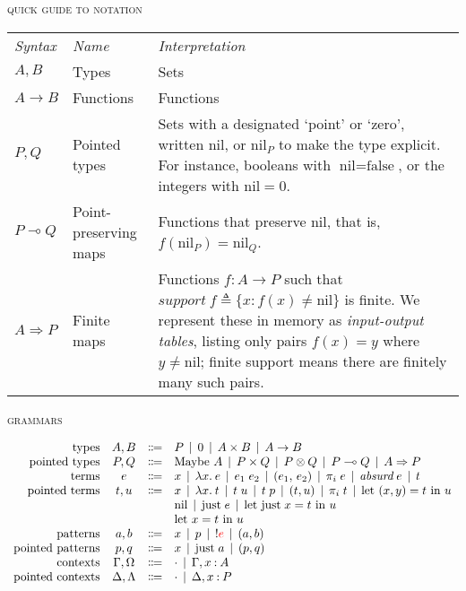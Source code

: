 \documentclass{article}
\newcommand\G\Gamma
\newcommand\D\Delta
\renewcommand\O\Omega
\renewcommand\L\Lambda
\newcommand\lto\multimap        %
\newcommand\fto{\Rightarrow}
\newcommand\tmaybe[1]{\ensuremath{{#1}_{*}}}
\renewcommand\tmaybe[1]{\ensuremath{\text{Maybe}~{#1}}}
\newcommand\bnfeq{\Coloneqq}
\newcommand\bnfor{\mathrel{\,|\,}}
\newcommand\emptycx{{\cdot}}
\newcommand\hyp[2]{{#1} \of {#2}}
\newcommand\of{\mathbin{:}}
\newcommand\fname\textit        %
\newcommand\cname\text          %
\newcommand\fnspace\:           %
\newcommand\fn[1]{\lambda{#1}.\fnspace}
\newcommand\<\;                 %
\newcommand\cnil{\cname{nil}}
\newcommand\cjust{\cname{just}}
\newcommand\tnil{\cnil}
\newcommand\tjust[1]{\cjust\<{#1}}
\newcommand\letin[2]{\text{let}~{#1}~\text{in}~{#2}}
\newcommand\leteq[3]{\letin{{#1} = {#2}}{#3}}
\newcommand\letjust[3]{\leteq{\tjust {#1}}{#2}{#3}}
\newcommand\letpair[4]{\leteq{({#1}, {#2})}{#3}{#4}}
\newcommand\tabsurd{\fname{absurd}\<}
\newcommand\peq{{!}}
\newcommand\todocolor{\color{red}}
\begin{document}

\noindent\textsc{quick guide to notation}

\newcommand\support{\ensuremath{\fname{support}}}
\newcommand\supportof[1]{\ensuremath{\support~{#1}}}
\newcommand\defeq{\triangleq}

\begin{tabular}{llp{10cm}}%
  \it Syntax & \it Name & \it Interpretation\\
  $A,B$ & Types & Sets\\
  $A \to B$ & Functions & Functions\\
  $P,Q$ & Pointed types & Sets with a designated `point' or `zero', written $\tnil$, or $\tnil_P$ to make the type explicit.
  For instance, booleans with $\tnil = \text{false}$, or the integers with $\tnil = 0$.
  \\
  $P \lto Q$ & Point-preserving maps & Functions that preserve $\tnil$, that is, $f(\tnil_P) = \tnil_Q$.
  \\
  $A \fto P$ & Finite maps &
  Functions $f : A \to P$ such that $\supportof{f} \defeq \{ x : f(x) \ne \tnil \}$ is finite.
  We represent these in memory as \emph{input-output tables}, listing only pairs $f(x) = y$ where $y \ne \tnil$; finite support means there are finitely many such pairs.
\end{tabular}


\noindent
\textsc{grammars}

\[
\begin{array}{rccl}
  \text{types} & A,B &\bnfeq&
  P \bnfor 0 \bnfor A \times B \bnfor A \to B
  \\
  \text{pointed types} & P,Q &\bnfeq&
  \tmaybe A \bnfor P \times Q \bnfor P \otimes Q
  \bnfor P \lto Q
  \bnfor A \fto P
  \\
  \text{terms} & e &\bnfeq& x \bnfor \fn{x} e \bnfor e_1\<e_2
  \bnfor (e_1,\, e_2) \bnfor \pi_i \<e \bnfor \tabsurd e \bnfor t
  \\
  \text{pointed terms} & t,u &\bnfeq&
  x \bnfor \fn{x} t \bnfor t \< u \bnfor t \< p
  \bnfor (t,u) \bnfor \pi_i \<t \bnfor \letpair{x}{y}{t}{u}
  \\
  &&&
  \tnil \bnfor \tjust e
  \bnfor \letjust x t u
  \\
  &&& \leteq x t u
  \\
  \text{patterns} & a,b &\bnfeq&
  x
  \bnfor p
  \bnfor \peq {\todocolor e}   %
  \bnfor (a, b)
  \\
  \text{pointed patterns} & p,q &\bnfeq&
  x \bnfor \tjust a \bnfor (p,q)
  \\
  \text{contexts} & \G,\O &\bnfeq& \emptycx \bnfor \G, \hyp x A
  \\
  \text{pointed contexts} & \D,\L %
  &\bnfeq& \emptycx \bnfor \D, \hyp x P
  \\
\end{array}
\]
\end{document}
